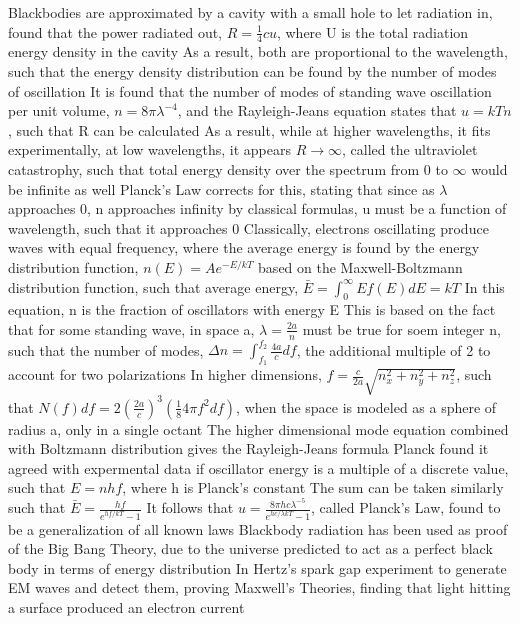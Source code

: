 \documentclass[11 pt, twoside]{article}
\newenvironment{outline*}
{
	\begin{outline}[enumerate]
	}
	{\end{outline}
}
\begin{document}
\begin{outline*}
	\2 Blackbodies are approximated by a cavity with a small hole to let radiation in, found that the power radiated out, $R = \frac{1}{4}cu$, where U is the total radiation energy density in the cavity
		\3 As a result, both are proportional to the wavelength, such that the energy density distribution can be found by the number of modes of oscillation
		\3 It is found that the number of modes of standing wave oscillation per unit volume, $n = 8\pi\lambda^{-4}$, and the Rayleigh-Jeans equation states that $u = kTn$, such that R can be calculated
		\3 As a result, while at higher wavelengths, it fits experimentally, at low wavelengths, it appears $R \to \infty$, called the ultraviolet catastrophy, such that total energy density over the spectrum from 0 to $\infty$ would be infinite as well
	\2 Planck's Law corrects for this, stating that since as $\lambda$ approaches 0, n approaches infinity by classical formulas, u must be a function of wavelength, such that it approaches 0
		\3 Classically, electrons oscillating produce waves with equal frequency, where the average energy is found by the energy distribution function, $n(E) = Ae^{-E/kT}$ based on the Maxwell-Boltzmann distribution function, such that average energy, $\bar{E} = \int^\infty_0 Ef(E)dE = kT$
			\4 In this equation, n is the fraction of oscillators with energy E
			\4 This is based on the fact that for some standing wave, in space a, $\lambda = \frac{2a}{n}$ must be true for soem integer n, such that the number of modes, $\Delta n = \int^{f_2}_{f_1} \frac{4a}{c}df$, the additional multiple of 2 to account for two polarizations
			\4 In higher dimensions, $f = \frac{c}{2a}\sqrt{n_x^2 + n_y^2 + n_z^2}$, such that $N(f)df = 2(\frac{2a}{c})^3(\frac{1}{8}4\pi f^2df)$, when the space is modeled as a sphere of radius a, only in a single octant
			\4 The higher dimensional mode equation combined with Boltzmann distribution gives the Rayleigh-Jeans formula
		\3 Planck found it agreed with expermental data if oscillator energy is a multiple of a discrete value, such that $E = nhf$, where h is Planck's constant
			\4 The sum can be taken similarly  such that $\bar{E} = \frac{hf}{e^{hf/kT} - 1}$
			\4 It follows that $u = \frac{8\pi hc\lambda^{-5}}{e^{hc/\lambda kT} - 1}$, called Planck's Law, found to be a generalization of all known laws
	\2 Blackbody radiation has been used as proof of the Big Bang Theory, due to the universe predicted to act as a perfect black body in terms of energy distribution
\1 In Hertz's spark gap experiment to generate EM waves and detect them, proving Maxwell's Theories, finding that light hitting a surface produced an electron current

\end{outline*}
\end{document}
